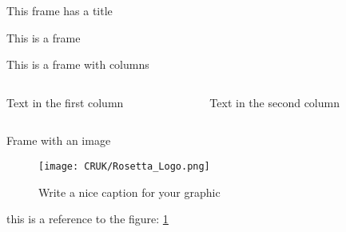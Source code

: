 \begin{frame}{This frame has a title}

This is a frame
\end{frame}

\begin{frame}{This is a frame with columns}
\begin{columns}
\begin{column}{.5\paperwidth}
Text in the first column
\end{column}
\begin{column}{.5\paperwidth}
Text in the second column
\end{column}
\end{columns}
\end{frame}

\begin{frame}{Frame with an image}
\begin{figure}[H]
	\label{figure2}
	\centering
    \texttt{[image: CRUK/Rosetta\_Logo.png]}
    \caption{Write a nice caption for your graphic}
\end{figure}
this is a reference to the figure: \cref{figure2}
\end{frame}
